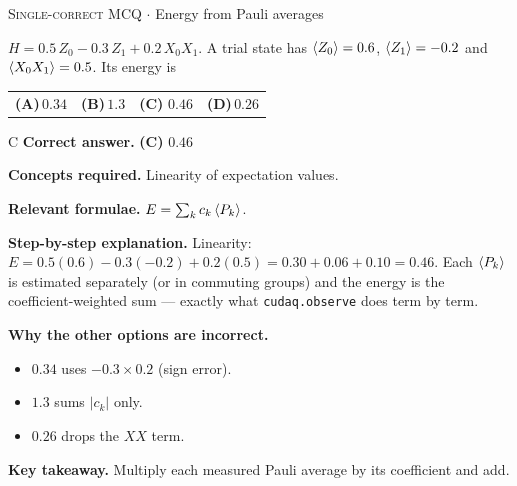 \documentclass[11pt,a4paper]{article}
\newcommand{\optlabel}[1]{\textbf{(#1)}}
\newcommand{\correctlabel}[1]{\textcolor{okgreen}{\textbf{(#1)}\,\ding{51}}}
\newenvironment{qitem}[1]{\begin{list}{}{\setlength{\leftmargin}{3.3em}\setlength{\labelwidth}{3.1em}%
  \setlength{\labelsep}{0.2em}\setlength{\topsep}{3pt}\setlength{\parsep}{3pt}}\item[\textbf{Q.#1}\hfill]}{\end{list}}
\newcommand{\qsep}{\par\vspace{2pt}{\color{black!15}\hrule}\vspace{4pt}}
\newcommand{\qmeta}[2]{{\footnotesize\color{black!60}\textsc{#1} \;$\cdot$\; #2}\par}
\begin{document}
\begin{qitem}{47}
\qmeta{Single-correct MCQ}{Energy from Pauli averages}
$H = 0.5\,Z_0 - 0.3\,Z_1 + 0.2\,X_0X_1$. A trial state has $\braket{Z_0} = 0.6$, $\braket{Z_1} = -0.2$ and $\braket{X_0X_1} = 0.5$. Its energy is
\par\smallskip\noindent\begin{tabularx}{\linewidth}{@{}*{4}{L}@{}}
\optlabel{A}\,$0.34$ & \optlabel{B}\,$1.3$ & \correctlabel{C}\,$0.46$ & \optlabel{D}\,$0.26$
\end{tabularx}
\end{qitem}
\begin{solbox}{C}
\textbf{\color{brand}Correct answer.} \textcolor{okgreen}{\textbf{(C)}} $0.46$

\textbf{\color{brand}Concepts required.} Linearity of expectation values.

\textbf{\color{brand}Relevant formulae.} $E = \sum_kc_k\braket{P_k}$.

\textbf{\color{brand}Step-by-step explanation.} Linearity: $E = 0.5(0.6) - 0.3(-0.2) + 0.2(0.5) = 0.30 + 0.06 + 0.10 = 0.46$. Each $\braket{P_k}$ is estimated separately (or in commuting groups) and the
energy is the coefficient-weighted sum --- exactly what \texttt{cudaq.observe} does term by term.

\textbf{\color{brand}Why the other options are incorrect.}
\begin{itemize}[leftmargin=2.4em, itemsep=1pt, topsep=2pt]
\item[\textbf{(A)}] $0.34$ uses $-0.3\times0.2$ (sign error).
\item[\textbf{(B)}] $1.3$ sums $|c_k|$ only.
\item[\textbf{(D)}] $0.26$ drops the $XX$ term.
\end{itemize}
\textbf{\color{brand}Key takeaway.} Multiply each measured Pauli average by its coefficient and add.
\end{solbox}
\qsep
\end{document}
